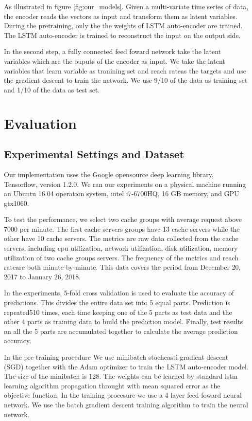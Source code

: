 \documentclass[5p]{elsarticle}
\newcommand{\dabiaolv}{reach rate}
\begin{document}
As illustrated in figure \ref{fig:our_models}. Given a multi-variate time series of data, the encoder reads the vectors as input and transform them as latent variables. During the pretraining, only the the weights of LSTM auto-encoder are trained. The LSTM auto-encoder is trained to reconstruct the input on the output side. 

In the second step, a fully connected feed foward network take the latent variables which are the ouputs of the encoder as input. We take the latent variables that learn variable as tranining set and \dabiaolv as the targets and use the gradient descent to train the network. We use 9/10 of the data as training set and 1/10 of the data as test set.

\section{Evaluation}
\subsection{Experimental Settings and Dataset}
Our implementation uses the Google opensource deep learning library, Tensorflow\cite{TensorFlow}, version 1.2.0. We ran our experiments on a physical machine running an Ubuntu 16.04 operation system, intel i7-6700HQ, 16 GB memory, and GPU gtx1060.

To test the performance, we select two cache groups with average request above 7000 per minute. The first cache servers groups have 13 cache servers while the other have 10 cache servers. The  metrics are raw data collected from the cache servers, including cpu utilization, network utilization, disk utilization, memory utilization of two cache groups servers. The frequency of the metrics and  \dabiaolv are both minute-by-minute. This data covers the period from December 20, 2017 to January 26, 2018.

In the experiments, 5-fold cross validation is used to evaluate the accuracy of predictions. This divides the entire data set into 5 equal parts.  Prediction is repeated510 times, each time keeping one of the 5 parts as test data and the other 4 parts as training data to build the prediction model. Finally, test results on all the 5 parts are accumulated together to calculate the average prediction accuracy.

In the pre-training procedure We use minibatch stochcasti gradient descent (SGD) together with the Adam optimizer to train the LSTM auto-encoder model. The size of the minibatch is 128. The weights can be learned by standard lstm learning algorithm propagation throught with mean squared error as the objective function. In the training procesure we use a 4 layer feed-foward neural network. We use the batch gradient descent training algorithm to train the neural network.
\end{document}
